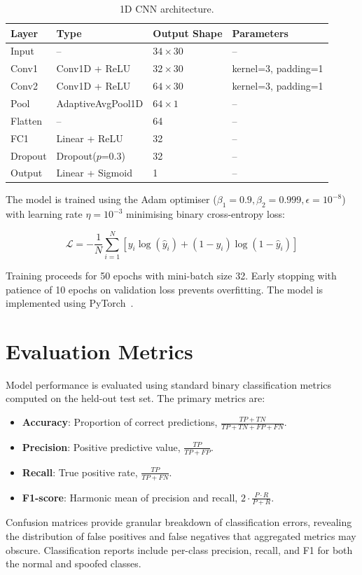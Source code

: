 \begin{table}[H]
\centering
\caption{1D CNN architecture.}
\label{tab:cnn_arch}
\begin{tabular}{@{}llll@{}}
\toprule
\textbf{Layer} & \textbf{Type} & \textbf{Output Shape} & \textbf{Parameters} \\
\midrule
Input    & -- & $34 \times 30$ & -- \\
Conv1    & Conv1D + ReLU & $32 \times 30$ & kernel=3, padding=1 \\
Conv2    & Conv1D + ReLU & $64 \times 30$ & kernel=3, padding=1 \\
Pool     & AdaptiveAvgPool1D & $64 \times 1$ & -- \\
Flatten  & -- & 64 & -- \\
FC1      & Linear + ReLU & 32 & -- \\
Dropout  & Dropout($p$=0.3) & 32 & -- \\
Output   & Linear + Sigmoid & 1 & -- \\
\bottomrule
\end{tabular}
\end{table}

The model is trained using the Adam optimiser (\(\beta_1 = 0.9, \beta_2 = 0.999, \epsilon = 10^{-8}\)) with learning rate \(\eta = 10^{-3}\) minimising binary cross-entropy loss:

\begin{equation}
    \mathcal{L} = -\frac{1}{N} \sum_{i=1}^{N} \left[ y_i \log(\hat{y}_i) + (1 - y_i) \log(1 - \hat{y}_i) \right]
    \label{eq:bce}
\end{equation}

Training proceeds for 50 epochs with mini-batch size 32. Early stopping with patience of 10 epochs on validation loss prevents overfitting. The model is implemented using PyTorch~\cite{Paszke2019}.

\section{Evaluation Metrics}

Model performance is evaluated using standard binary classification metrics computed on the held-out test set. The primary metrics are:

\begin{itemize}
    \item \textbf{Accuracy}: Proportion of correct predictions, \(\frac{TP + TN}{TP + TN + FP + FN}\).
    \item \textbf{Precision}: Positive predictive value, \(\frac{TP}{TP + FP}\).
    \item \textbf{Recall}: True positive rate, \(\frac{TP}{TP + FN}\).
    \item \textbf{F1-score}: Harmonic mean of precision and recall, \(2 \cdot \frac{P \cdot R}{P + R}\).
\end{itemize}

Confusion matrices provide granular breakdown of classification errors, revealing the distribution of false positives and false negatives that aggregated metrics may obscure. Classification reports include per-class precision, recall, and F1 for both the normal and spoofed classes.
